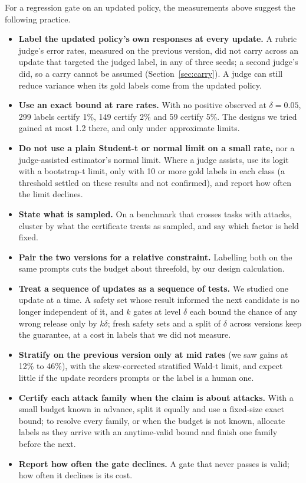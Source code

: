 \documentclass[letterpaper]{article} %
\newcommand{\SWT}{stratified Wald-t limit}
\begin{document}
For a regression gate on an updated policy, the measurements above suggest the following practice.
\begin{itemize}
\item \textbf{Label the updated policy's own responses at every update.} A rubric judge's error rates, measured on
  the previous version, did not carry across an update that targeted the judged label, in any of three seeds; a second
  judge's did, so a carry cannot be assumed (Section~\ref{sec:carry}). A judge can still reduce variance when its gold
  labels come from the updated policy.
\item \textbf{Use an exact bound at rare rates.} With no positive observed at $\delta=0.05$, 299 labels certify 1\%, 149
  certify 2\% and 59 certify 5\%. The designs we tried gained at most 1.2 there, and only under approximate limits.
\item \textbf{Do not use a plain Student-t or normal limit on a small rate,} nor a judge-assisted estimator's normal
  limit. Where a judge assists, use its logit with a bootstrap-t limit, only with 10 or more gold labels in each class (a
  threshold settled on these results and not confirmed), and report how often the limit declines.
\item \textbf{State what is sampled.} On a benchmark that crosses tasks with attacks, cluster by what the certificate
  treats as sampled, and say which factor is held fixed.
\item \textbf{Pair the two versions for a relative constraint.} Labelling both on the same prompts cuts the budget about
  threefold, by our design calculation.
\item \textbf{Treat a sequence of updates as a sequence of tests.} We studied one update at a time. A safety set whose
  result informed the next candidate is no longer independent of it, and $k$ gates at level
  $\delta$ each bound the chance of any wrong release only by $k\delta$; fresh safety sets and a split of $\delta$ across
  versions keep the guarantee, at a cost in labels that we did not measure.
\item \textbf{Stratify on the previous version only at mid rates} (we saw gains at 12\% to 46\%), with the skew-corrected \SWT{}, and expect
  little if the update reorders prompts or the label is a human one.
\item \textbf{Certify each attack family when the claim is about attacks.} With a small budget known in advance, split it equally and use a fixed-size exact bound; to resolve every family,
  or when the budget is not known, allocate labels as they arrive with an anytime-valid bound and finish one family
  before the next.
\item \textbf{Report how often the gate declines.} A gate that never passes is valid; how often it declines is its
  cost.
\end{itemize}
\end{document}
